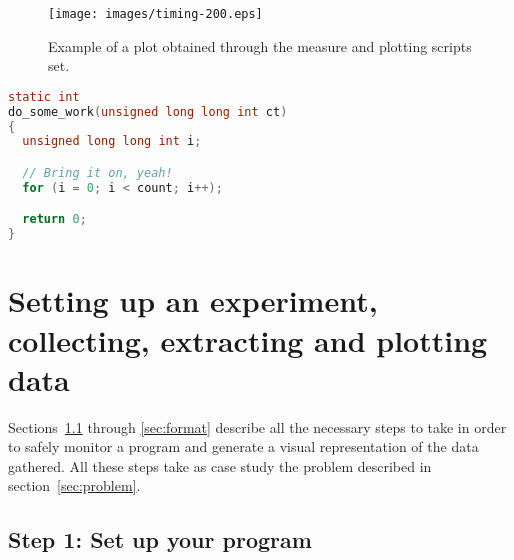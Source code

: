\begin{figure}
\centering
\texttt{[image: images/timing-200.eps]}
\caption{Example of a plot obtained through the measure and plotting scripts set.}
\label{fig:timing-200}
\end{figure}

\begin{lstlisting}[caption={``Computation''-intensive algorithm used as case study in this tutorial.},label={lst:do_some_work},language=C]
static int
do_some_work(unsigned long long int ct)
{
  unsigned long long int i;

  // Bring it on, yeah!
  for (i = 0; i < count; i++);

  return 0;
}
\end{lstlisting}

\section{Setting up an experiment, collecting, extracting and plotting data}
\label{sec:process}
Sections~\ref{sec:setup} through \ref{sec:format} describe all the necessary steps to take in order to safely monitor a program and generate a visual representation of the data gathered. All these steps take as case study the problem described in section~\ref{sec:problem}.

\subsection{Step 1: Set up your program}
\label{sec:setup}

